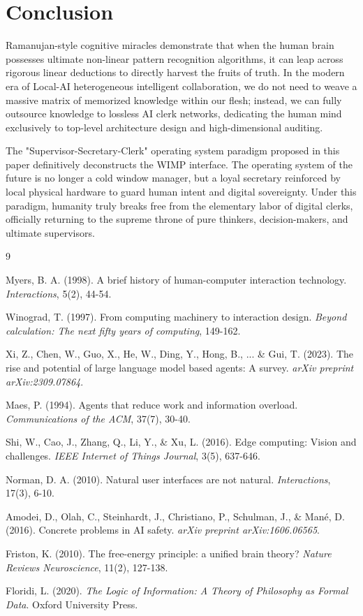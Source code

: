 \documentclass[11pt,a4paper]{article}
\begin{document}
\section{Conclusion}

Ramanujan-style cognitive miracles demonstrate that when the human brain possesses ultimate non-linear pattern recognition algorithms, it can leap across rigorous linear deductions to directly harvest the fruits of truth. In the modern era of Local-AI heterogeneous intelligent collaboration, we do not need to weave a massive matrix of memorized knowledge within our flesh; instead, we can fully outsource knowledge to lossless AI clerk networks, dedicating the human mind exclusively to top-level architecture design and high-dimensional auditing.

The "Supervisor-Secretary-Clerk" operating system paradigm proposed in this paper definitively deconstructs the WIMP interface. The operating system of the future is no longer a cold window manager, but a loyal secretary reinforced by local physical hardware to guard human intent and digital sovereignty. Under this paradigm, humanity truly breaks free from the elementary labor of digital clerks, officially returning to the supreme throne of pure thinkers, decision-makers, and ultimate supervisors.

\begin{thebibliography}{9}

Myers, B. A. (1998). A brief history of human-computer interaction technology. \textit{Interactions}, 5(2), 44-54.

Winograd, T. (1997). From computing machinery to interaction design. \textit{Beyond calculation: The next fifty years of computing}, 149-162.

Xi, Z., Chen, W., Guo, X., He, W., Ding, Y., Hong, B., ... \& Gui, T. (2023). The rise and potential of large language model based agents: A survey. \textit{arXiv preprint arXiv:2309.07864}.

Maes, P. (1994). Agents that reduce work and information overload. \textit{Communications of the ACM}, 37(7), 30-40.

Shi, W., Cao, J., Zhang, Q., Li, Y., \& Xu, L. (2016). Edge computing: Vision and challenges. \textit{IEEE Internet of Things Journal}, 3(5), 637-646.

Norman, D. A. (2010). Natural user interfaces are not natural. \textit{Interactions}, 17(3), 6-10.

Amodei, D., Olah, C., Steinhardt, J., Christiano, P., Schulman, J., \& Mané, D. (2016). Concrete problems in AI safety. \textit{arXiv preprint arXiv:1606.06565}.

Friston, K. (2010). The free-energy principle: a unified brain theory? \textit{Nature Reviews Neuroscience}, 11(2), 127-138.

Floridi, L. (2020). \textit{The Logic of Information: A Theory of Philosophy as Formal Data}. Oxford University Press.

\end{thebibliography}
\end{document}
